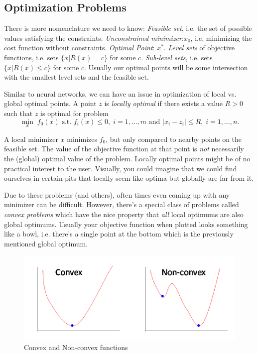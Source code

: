 \documentclass[11 pt]{scrartcl}
\begin{document}
\subsection{Optimization Problems}
There is more nomenclature we need to know: 
\itemnum
    \ii \emph{Feasible set}, i.e. the set of possible values satisfying the constraints. 
    \ii \emph{Unconstrained minimizer}:$x_0$, i.e. minimizing the cost function without constraints. 
    \ii \emph{Optimal Point}: $x^*$. 
    \ii \emph{Level sets} of objective functions, i.e. sets $\{x | R(x) = c\}$ for some $c$. 
    \ii \emph{Sub-level sets}, i.e. sets $\{ x | R(x) \leq c\}$ for some $c$. 
\itemend
Usually our optimal points will be some intersection with the smallest level sets and the feasible set. 

Similar to neural networks, we can have an issue in optimization of local vs. global optimal points. 
A point $z$ is \emph{locally optimal} if there exists a value $R>0$ such that $z$ is optimal for problem 
\[ \min_x\; f_0(x) \text{ s.t. } f_i(x) \leq 0,\;  i=1, \dots, m \text{ and } |x_i - z_i| \leq R,\; i=1, \dots, n.\] 

A local minimizer $x$ minimizes $f_0$, but only compared to nearby points on the feasible set. 
The value of the objective function at that point is \emph{not} necessarily the (global) optimal value of the problem. 
Locally optimal points might be of no practical interest to the user. 
Visually, you could imagine that we could find ourselves in certain pits that locally seem like optima but globally are far from it. 

Due to these problems (and others), often times even coming up with any minimizer can be difficult. 
However, there's a special class of problems called \emph{convex problems} which have the nice property that \emph{all} local optimums are also global optimums.
Usually your objective function when plotted looks something like a bowl, i.e. there's a single point at the bottom which is the previously mentioned global optimum.

\begin{figure}[!htb]
    \centering
    \includegraphics[scale=0.6]{convexnonconvex.png}
    \caption{Convex and Non-convex functions}
\end{figure}
\end{document}
